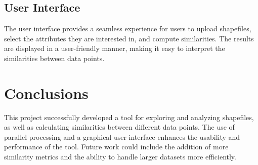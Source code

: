 \documentclass{article}
\begin{document}
\subsection{User Interface}
The user interface provides a seamless experience for users to upload shapefiles, select the attributes they are interested in, and compute similarities. The results are displayed in a user-friendly manner, making it easy to interpret the similarities between data points.

\section{Conclusions}
This project successfully developed a tool for exploring and analyzing shapefiles, as well as calculating similarities between different data points. The use of parallel processing and a graphical user interface enhances the usability and performance of the tool. Future work could include the addition of more similarity metrics and the ability to handle larger datasets more efficiently.
\end{document}
